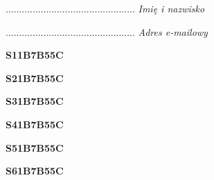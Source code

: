 \begin{turn}{90}\begin{minipage}{\linewidth} \vspace{20mm} ................................................  \textit{Imię i nazwisko}\end{minipage}\end{turn}

\begin{turn}{90}\begin{minipage}{\linewidth} \vspace{20mm} ................................................  \textit{Adres e-mailowy}\end{minipage}\end{turn}

\begin{turn}{90}\huge \begin{minipage}{\linewidth} \vspace{10mm}\textbf{S11B7B55C}\end{minipage}\end{turn}

\begin{turn}{90}\huge \begin{minipage}{\linewidth} \vspace{10mm}\textbf{S21B7B55C}\end{minipage}\end{turn}

\begin{turn}{90}\huge \begin{minipage}{\linewidth} \vspace{10mm}\textbf{S31B7B55C}\end{minipage}\end{turn}

\begin{turn}{90}\huge \begin{minipage}{\linewidth} \vspace{10mm}\textbf{S41B7B55C}\end{minipage}\end{turn}

\begin{turn}{90}\huge \begin{minipage}{\linewidth} \vspace{10mm}\textbf{S51B7B55C}\end{minipage}\end{turn}

\begin{turn}{90}\huge \begin{minipage}{\linewidth} \vspace{10mm}\textbf{S61B7B55C}\end{minipage}\end{turn}

